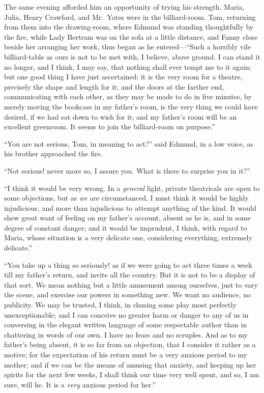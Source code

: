 The same evening afforded him an opportunity of trying
his strength.  Maria, Julia, Henry Crawford, and Mr.\ Yates
were in the billiard-room. Tom, returning from them into
the drawing-room, where Edmund was standing thoughtfully
by the fire, while Lady Bertram was on the sofa at a
little distance, and Fanny close beside her arranging
her work, thus began as he entered---``Such a horribly vile
billiard-table as ours is not to be met with, I believe,
above ground.  I can stand it no longer, and I think,
I may say, that nothing shall ever tempt me to it again;
but one good thing I have just ascertained:  it is the very
room for a theatre, precisely the shape and length for it;
and the doors at the farther end, communicating with each other,
as they may be made to do in five minutes, by merely moving
the bookcase in my father's room, is the very thing we
could have desired, if we had sat down to wish for it;
and my father's room will be an excellent greenroom.
It seems to join the billiard-room on purpose.''

``You are not serious, Tom, in meaning to act?'' said Edmund,
in a low voice, as his brother approached the fire.

``Not serious! never more so, I assure you.  What is there
to surprise you in it?''

``I think it would be very wrong.  In a \emph{general} light,
private theatricals are open to some objections, but as \emph{we}
are circumstanced, I must think it would be highly injudicious,
and more than injudicious to attempt anything of the kind.
It would shew great want of feeling on my father's account,
absent as he is, and in some degree of constant danger;
and it would be imprudent, I think, with regard to Maria,
whose situation is a very delicate one, considering everything,
extremely delicate.''

``You take up a thing so seriously! as if we were going
to act three times a week till my father's return,
and invite all the country.  But it is not to be a
display of that sort.  We mean nothing but a little
amusement among ourselves, just to vary the scene,
and exercise our powers in something new.  We want
no audience, no publicity.  We may be trusted, I think,
in chusing some play most perfectly unexceptionable;
and I can conceive no greater harm or danger to any of us
in conversing in the elegant written language of some
respectable author than in chattering in words of our own.
I have no fears and no scruples.  And as to my father's
being absent, it is so far from an objection, that I
consider it rather as a motive; for the expectation
of his return must be a very anxious period to my mother;
and if we can be the means of amusing that anxiety,
and keeping up her spirits for the next few weeks, I shall
think our time very well spent, and so, I am sure, will he.
It is a \emph{very} anxious period for her.''

